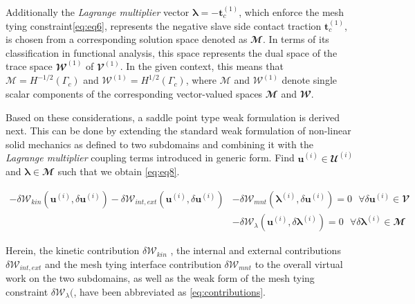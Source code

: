 \documentclass[a4paper,10pt]{article} %
\begin{document}
Additionally the \textit{Lagrange multiplier} vector $\boldsymbol{\lambda} = -\mathbf{t}_c^{(1)}$, which enforce the mesh tying constraint\eqref{eq:eq6}, represents the negative slave side contact traction $\mathbf{t}_c^{(1)}$, is chosen from a
corresponding solution space denoted as $\mathbfcal{M}$.  In terms of its classification in functional analysis, this space represents the dual space of the trace space $\mathbfcal{W}^{(1)}$ of $\mathbfcal{V}^{(1)}$. In the given context, this means that $\mathcal{M} = H^{−1/2} (\Gamma_c)$ and $\mathcal{W}^{(1)} = H^{1/2} (\Gamma_c)$, where $\mathcal{M}$  and $\mathcal{W}^{(1)}$ denote single scalar components of the corresponding vector-valued spaces $\mathbfcal{M}$ and $\mathbfcal{W}$.

Based on these considerations, a saddle point type weak formulation is derived next. This can be done by extending the standard weak formulation of non-linear solid mechanics as defined to two subdomains and combining it with the \textit{Lagrange multiplier} coupling terms introduced in generic form. Find $\mathbf{u}^{(i)} \in \mathbfcal{U}^{(i)}$ and $\boldsymbol{\lambda} \in \mathbfcal{M}$ such that we obtain \eqref{eq:eq8}.

\begin{subequations}
    \begin{align}
        -\delta \mathcal{W}_{kin}(\mathbf{u}^{(i)},\delta \mathbf{u}^{(i)}) - \delta \mathcal{W}_{int,ext}(\mathbf{u}^{(i)},\delta \mathbf{u}^{(i)}) & - \delta\mathcal{W}_{mnt}(\boldsymbol{\lambda}^{(i)},\delta \mathbf{u}^{(i)}) = 0 \text{ } \forall \delta \mathbf{u}^{(i)} \in  \mathbfcal{V} \label{eq:subeq8} \\ 
        & - \delta\mathcal{W}_{\lambda}(\mathbf{u}^{(i)},\delta \boldsymbol{\lambda}^{(i)}) = 0 \text{ } \forall \delta \boldsymbol{\lambda}^{(i)} \in  \mathbfcal{M} \label{eq:subeq9}
    \end{align}
\end{subequations}

Herein, the kinetic contribution $\delta \mathcal{W}_{kin}$ , the internal and external contributions $\delta \mathcal{W}_{int,ext}$ and the mesh tying interface contribution $\delta\mathcal{W}_{mnt}$ to the overall virtual work on the two subdomains, as well as the weak form of the mesh tying constraint $\delta\mathcal{W}_{\lambda}($, have been abbreviated as \eqref{eq:contributions}.
\end{document}
